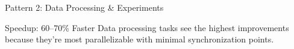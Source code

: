 \documentclass[aspectratio=169,11pt]{beamer}
\begin{document}
\begin{frame}{Pattern 2: Data Processing \& Experiments}
\begin{center}
    \end{center}

    \begin{block}{Speedup: 60--70\% Faster}
        \footnotesize
        Data processing tasks see the highest improvements because they're most parallelizable with minimal synchronization points.
    \end{block}
\end{frame}

\end{document}

